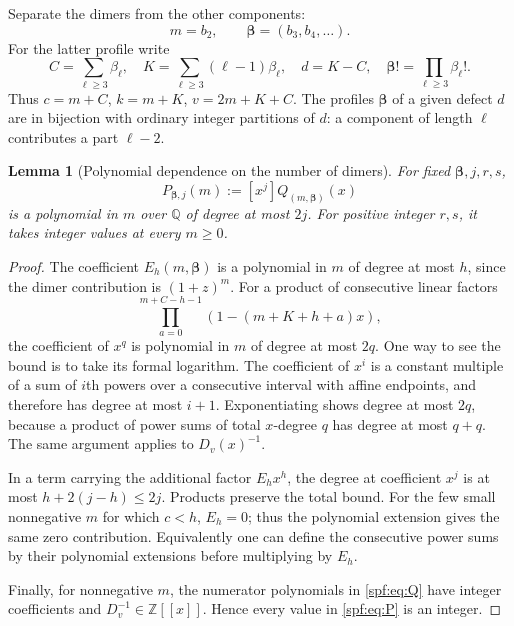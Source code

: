 \documentclass[11pt]{article}
\numberwithin{equation}{section}
\newtheorem{lemma}[theorem]{Lemma}
\theoremstyle{definition}
\theoremstyle{remark}
\theoremstyle{definition}
\newcommand{\Z}{\mathbb Z}
\newcommand{\Q}{\mathbb Q}
\newcommand{\betafac}{\boldsymbol\beta!}
\begin{document}
Separate the dimers from the other components:
\begin{equation}
 m=b_2,\qquad \boldsymbol\beta=(b_3,b_4,\ldots).
\end{equation}
For the latter profile write
\begin{equation}
 C=\sum_{\ell\ge3}\beta_\ell,\quad
 K=\sum_{\ell\ge3}(\ell-1)\beta_\ell,\quad
 d=K-C,\quad \betafac=\prod_{\ell\ge3}\beta_\ell!.
\end{equation}
Thus $c=m+C$, $k=m+K$, $v=2m+K+C$.
The profiles $\boldsymbol\beta$ of a given defect $d$ are in bijection with
ordinary integer partitions of $d$: a component of length $\ell$ contributes a
part $\ell-2$.

\begin{lemma}[Polynomial dependence on the number of dimers]
\label{spf:lem:polynomial}
For fixed $\boldsymbol\beta,j,r,s$,
\begin{equation}
 P_{\boldsymbol\beta,j}(m):=[x^j]Q_{(m,\boldsymbol\beta)}(x)
 \label{spf:eq:P}
\end{equation}
is a polynomial in $m$ over $\Q$ of degree at most $2j$. For positive integer
$r,s$, it takes integer values at every $m\ge0$.
\end{lemma}
\begin{proof}
The coefficient $E_h(m,\boldsymbol\beta)$ is a polynomial in $m$ of degree at
most $h$, since the dimer contribution is $(1+z)^m$.
For a product of consecutive linear factors
\begin{equation}
 \prod_{a=0}^{m+C-h-1}(1-(m+K+h+a)x),
\end{equation}
the coefficient of $x^q$ is polynomial in $m$ of degree at most $2q$.
One way to see the bound is to take its formal logarithm. The coefficient of
$x^i$ is a constant multiple of a sum of $i$th powers over a consecutive
interval with affine endpoints, and therefore has degree at most $i+1$.
Exponentiating shows degree at most $2q$, because a product of power sums of
total $x$-degree $q$ has degree at most $q+q$.
The same argument applies to $D_v(x)^{-1}$.

In a term carrying the additional factor $E_hx^h$, the degree at coefficient
$x^j$ is at most $h+2(j-h)\le2j$. Products preserve the total bound. For the
few small nonnegative $m$ for which $c<h$, $E_h=0$; thus the polynomial
extension gives the same zero contribution. Equivalently one can define the
consecutive power sums by their polynomial extensions before multiplying by
$E_h$.

Finally, for nonnegative $m$, the numerator polynomials in \eqref{spf:eq:Q} have
integer coefficients and $D_v^{-1}\in\Z[[x]]$. Hence every value in
\eqref{spf:eq:P} is an integer.
\end{proof}
\end{document}
